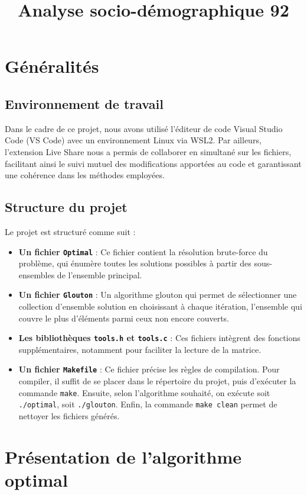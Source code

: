\documentclass[a4paper, 12pt, twoside]{article}
\title{Analyse socio-démographique 92}
\begin{document}
\pagedegarde

\tableofcontents
\newpage


\section{Généralités}

\subsection{Environnement de travail}

Dans le cadre de ce projet, nous avons utilisé l'éditeur de code Visual Studio Code (VS Code) avec un environnement Linux via WSL2. Par ailleurs, l'extension Live Share nous a permis de collaborer en simultané sur les fichiers, facilitant ainsi le suivi mutuel des modifications apportées au code et garantissant une cohérence dans les méthodes employées.

\subsection{Structure du projet}

Le projet est structuré comme suit :
\begin{itemize}
    \item \textbf{Un fichier \texttt{Optimal}} : Ce fichier contient la résolution brute-force du problème, qui énumère toutes les solutions possibles à partir des sous-ensembles de l’ensemble principal.
    \item \textbf{Un fichier \texttt{Glouton}} : Un algorithme glouton qui permet de sélectionner une collection d'ensemble solution en choisissant à chaque itération, l'ensemble qui couvre le plus d'éléments parmi ceux non encore couverts.
    \item \textbf{Les bibliothèques \texttt{tools.h} et \texttt{tools.c}} : Ces fichiers intègrent des fonctions supplémentaires, notamment pour faciliter la lecture de la matrice.
    \item \textbf{Un fichier \texttt{Makefile}} : Ce fichier précise les règles de compilation. Pour compiler, il suffit de se placer dans le répertoire du projet, puis d'exécuter la commande \texttt{make}. Ensuite, selon l'algorithme souhaité, on exécute soit \texttt{./optimal}, soit \texttt{./glouton}. Enfin, la commande \texttt{make clean} permet de nettoyer les fichiers générés.
\end{itemize}

\section{Présentation de l'algorithme optimal}
\end{document}
